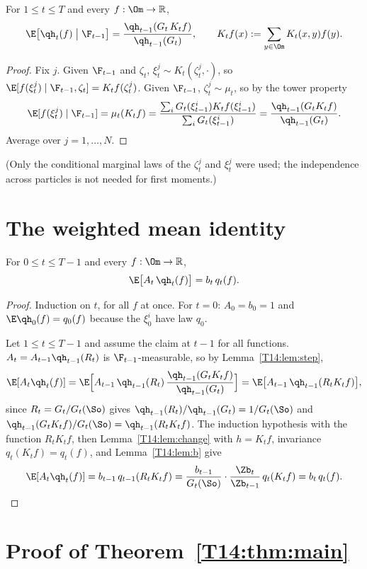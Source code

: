 \documentclass[11pt]{report}
\begin{document}
\begin{T14lemma}\label{T14:lem:step}
For $1\le t\le T$ and every $f:\Om\to\mathbb R$,
\[
\E\bigl[\qh_t(f)\bigm|\F_{t-1}\bigr]=\frac{\qh_{t-1}(G_t\,K_tf)}{\qh_{t-1}(G_t)},
\qquad K_tf(x):=\sum_{y\in\Om}K_t(x,y)f(y).
\]
\end{T14lemma}
\begin{proof}
Fix $j$. Given $\F_{t-1}$ and $\zeta_t$, $\xi_t^j\sim K_t(\zeta_t^j,\cdot)$, so
$\E[f(\xi_t^j)\mid\F_{t-1},\zeta_t]=K_tf(\zeta_t^j)$. Given $\F_{t-1}$, $\zeta_t^j\sim\mu_t$, so by the tower property
\[
\E[f(\xi_t^j)\mid\F_{t-1}]=\mu_t(K_tf)=\frac{\sum_iG_t(\xi_{t-1}^i)K_tf(\xi_{t-1}^i)}{\sum_iG_t(\xi_{t-1}^i)}
=\frac{\qh_{t-1}(G_tK_tf)}{\qh_{t-1}(G_t)}.
\]
Average over $j=1,\dots,N$.
\end{proof}

(Only the conditional marginal laws of the $\zeta_t^j$ and $\xi_t^j$ were used; the independence across particles is not
needed for first moments.)

\section{The weighted mean identity}

\begin{T14proposition}\label{T14:prop:unbiased}
For $0\le t\le T-1$ and every $f:\Om\to\mathbb R$,
\[
\E\bigl[A_t\,\qh_t(f)\bigr]=b_t\,q_t(f).
\]
\end{T14proposition}
\begin{proof}
Induction on $t$, for all $f$ at once. For $t=0$: $A_0=b_0=1$ and $\E\qh_0(f)=q_0(f)$ because the $\xi_0^i$ have law $q_0$.

Let $1\le t\le T-1$ and assume the claim at $t-1$ for all functions. $A_t=A_{t-1}\qh_{t-1}(R_t)$ is
$\F_{t-1}$-measurable, so by Lemma~\ref{T14:lem:step},
\[
\E[A_t\qh_t(f)]=\E\Bigl[A_{t-1}\,\qh_{t-1}(R_t)\,\frac{\qh_{t-1}(G_tK_tf)}{\qh_{t-1}(G_t)}\Bigr]
=\E\bigl[A_{t-1}\,\qh_{t-1}(R_tK_tf)\bigr],
\]
since $R_t=G_t/G_t(\So)$ gives $\qh_{t-1}(R_t)/\qh_{t-1}(G_t)=1/G_t(\So)$ and $\qh_{t-1}(G_tK_tf)/G_t(\So)
=\qh_{t-1}(R_tK_tf)$. The induction hypothesis with the function $R_tK_tf$, then Lemma~\ref{T14:lem:change} with
$h=K_tf$, invariance $q_t(K_tf)=q_t(f)$, and Lemma~\ref{T14:lem:b} give
\[
\E[A_t\qh_t(f)]=b_{t-1}\,q_{t-1}(R_tK_tf)=\frac{b_{t-1}}{G_t(\So)}\cdot\frac{\Zb_t}{\Zb_{t-1}}\,q_t(K_tf)=b_t\,q_t(f).
\qedhere
\]
\end{proof}

\section{Proof of Theorem~\ref{T14:thm:main}}
\end{document}
